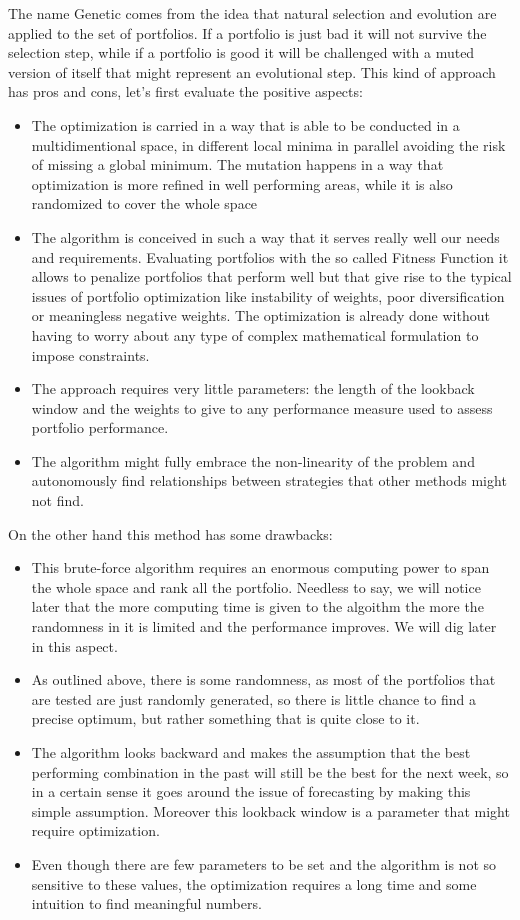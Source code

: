 The name Genetic comes from the idea that natural selection and evolution are applied to the set of portfolios. If a portfolio is just bad it will not survive the selection step, while if a portfolio is good it will be challenged with a muted version of itself that might represent an evolutional step. This kind of approach has pros and cons, let's first evaluate the positive aspects:
\begin{itemize}
	\item The optimization is carried in a way that is able to be conducted in a multidimentional space, in different local minima in parallel avoiding the risk of missing a global minimum. The mutation happens in a way that optimization is more refined in well performing areas, while it is also randomized to cover the whole space
	\item The algorithm is conceived in such a way that it serves really well our needs and requirements. Evaluating portfolios with the so called Fitness Function it allows to penalize portfolios that perform well but that give rise to the typical issues of portfolio optimization like instability of weights, poor diversification or meaningless negative weights. The optimization is already done without having to worry about any type of complex mathematical formulation to impose constraints.
	\item The approach requires very little parameters: the length of the lookback window and the weights to give to any performance measure used to assess portfolio performance.
	\item The algorithm might fully embrace the non-linearity of the problem and autonomously find relationships between strategies that other methods might not find. 
\end{itemize}  

On the other hand this method has some drawbacks:

\begin{itemize}
	\item This brute-force algorithm requires an enormous computing power to span the whole space and rank all the portfolio. Needless to say, we will notice later that the more computing time is given to the algoithm the more the randomness in it is limited and the performance improves. We will dig later in this aspect. 
	\item As outlined above, there is some randomness, as most of the portfolios that are tested are just randomly generated, so there is little chance to find a precise optimum, but rather something that is quite close to it.
	\item The algorithm looks backward and makes the assumption that the best performing combination in the past will still be the best for the next week, so in a certain sense it goes around the issue of forecasting by making this simple assumption. Moreover this lookback window is a parameter that might require optimization.
	\item Even though there are few parameters to be set and the algorithm is not so sensitive to these values, the optimization requires a long time and some intuition to find meaningful numbers.
\end{itemize}

